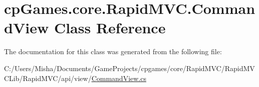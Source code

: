 \hypertarget{classcp_games_1_1core_1_1_rapid_m_v_c_1_1_command_view}{}\section{cp\+Games.\+core.\+Rapid\+M\+V\+C.\+Command\+View Class Reference}
\label{classcp_games_1_1core_1_1_rapid_m_v_c_1_1_command_view}


The documentation for this class was generated from the following file\+:\begin{DoxyCompactItemize}
\item 
C\+:/\+Users/\+Misha/\+Documents/\+Game\+Projects/cpgames/core/\+Rapid\+M\+V\+C/\+Rapid\+M\+V\+C\+Lib/\+Rapid\+M\+V\+C/api/view/\mbox{\hyperlink{_command_view_8cs}{Command\+View.\+cs}}\end{DoxyCompactItemize}
